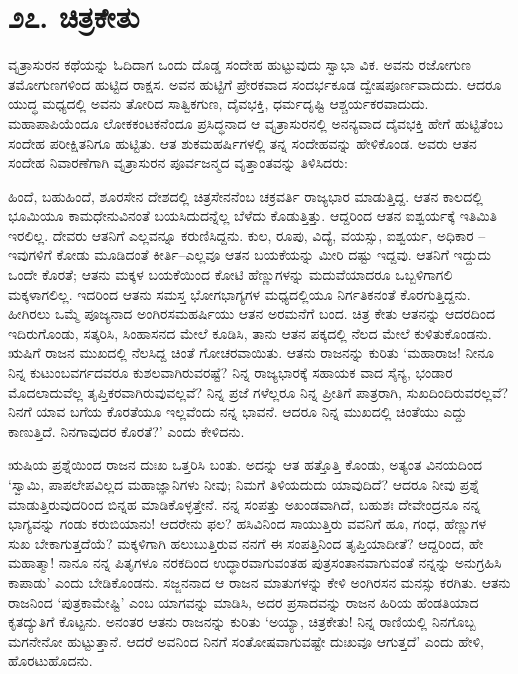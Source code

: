 
\chapter{೨೭. ಚಿತ್ರಕೇತು}

ವೃತ್ರಾಸುರನ ಕಥೆಯನ್ನು ಓದಿದಾಗ ಒಂದು ದೊಡ್ಡ ಸಂದೇಹ ಹುಟ್ಟುವುದು ಸ್ವಾಭಾ ವಿಕ. ಅವನು ರಜೋಗುಣ ತಮೋಗುಣಗಳಿಂದ ಹುಟ್ಟಿದ ರಾಕ್ಷಸ. ಅವನ ಹುಟ್ಟಿಗೆ ಪ್ರೇರಕವಾದ ಸಂದರ್ಭಕೂಡ ದ್ವೇಷಪೂರ್ಣವಾದುದು. ಆದರೂ ಯುದ್ಧ ಮಧ್ಯದಲ್ಲಿ ಅವನು ತೋರಿದ ಸಾತ್ವಿಕಗುಣ, ದೈವಭಕ್ತಿ, ಧರ್ಮದೃಷ್ಟಿ ಆಶ್ಚರ್ಯಕರವಾದುದು. ಮಹಾಪಾಪಿಯೆಂದೂ ಲೋಕಕಂಟಕನೆಂದೂ ಪ್ರಸಿದ್ಧನಾದ ಆ ವೃತ್ರಾಸುರನಲ್ಲಿ ಅನನ್ಯವಾದ ದೈವಭಕ್ತಿ ಹೇಗೆ ಹುಟ್ಟಿತೆಂಬ ಸಂದೇಹ ಪರೀಕ್ಷಿತನಿಗೂ ಹುಟ್ಟಿತು. ಆತ ಶುಕಮಹರ್ಷಿಗಳಲ್ಲಿ ತನ್ನ ಸಂದೇಹವನ್ನು ಹೇಳಿಕೊಂಡ. ಅವರು ಆತನ ಸಂದೇಹ ನಿವಾರಣೆಗಾಗಿ ವೃತ್ರಾಸುರನ ಪೂರ್ವಜನ್ಮದ ವೃತ್ತಾಂತವನ್ನು ತಿಳಿಸಿದರು:

ಹಿಂದೆ, ಬಹುಹಿಂದೆ, ಶೂರಸೇನ ದೇಶದಲ್ಲಿ ಚಿತ್ರಸೇನನೆಂಬ ಚಕ್ರವರ್ತಿ ರಾಜ್ಯಭಾರ ಮಾಡುತ್ತಿದ್ದ. ಆತನ ಕಾಲದಲ್ಲಿ ಭೂಮಿಯೂ ಕಾಮಧೇನುವಿನಂತೆ ಬಯಸಿದುದನ್ನೆಲ್ಲ ಬೆಳೆದು ಕೊಡುತ್ತಿತ್ತು. ಆದ್ದರಿಂದ ಆತನ ಐಶ್ವರ್ಯಕ್ಕೆ ಇತಿಮಿತಿ ಇರಲಿಲ್ಲ. ದೇವರು ಆತನಿಗೆ ಎಲ್ಲವನ್ನೂ ಕರುಣಿಸಿದ್ದನು. ಕುಲ, ರೂಪು, ವಿದ್ಯೆ, ವಯಸ್ಸು, ಐಶ್ವರ್ಯ, ಅಧಿಕಾರ –ಇವುಗಳಿಗೆ ಕೋಡು ಮೂಡಿದಂತೆ ಕೀರ್ತಿ–ಎಲ್ಲವೂ ಆತನ ಬಯಕೆಯನ್ನು ಮೀರಿ ದಷ್ಟು ಇದ್ದವು. ಆತನಿಗೆ ಇದ್ದುದು ಒಂದೇ ಕೊರತೆ; ಆತನು ಮಕ್ಕಳ ಬಯಕೆಯಿಂದ ಕೋಟಿ ಹೆಣ್ಣುಗಳನ್ನು ಮದುವೆಯಾದರೂ ಒಬ್ಬಳಿಗಾಗಲಿ ಮಕ್ಕಳಾಗಲಿಲ್ಲ. ಇದರಿಂದ ಆತನು ಸಮಸ್ತ ಭೋಗಭಾಗ್ಯಗಳ ಮಧ್ಯದಲ್ಲಿಯೂ ನಿರ್ಗತಿಕನಂತೆ ಕೊರಗುತ್ತಿದ್ದನು. ಹೀಗಿರಲು ಒಮ್ಮೆ ಪೂಜ್ಯನಾದ ಅಂಗಿರಸಮಹರ್ಷಿಯು ಆತನ ಅರಮನೆಗೆ ಬಂದ. ಚಿತ್ರ ಕೇತು ಆತನನ್ನು ಆದರದಿಂದ ಇದಿರುಗೊಂಡು, ಸತ್ಕರಿಸಿ, ಸಿಂಹಾಸನದ ಮೇಲೆ ಕೂಡಿಸಿ, ತಾನು ಆತನ ಪಕ್ಕದಲ್ಲಿ ನೆಲದ ಮೇಲೆ ಕುಳಿತುಕೊಂಡನು. ಋಷಿಗೆ ರಾಜನ ಮುಖದಲ್ಲಿ ನೆಲಸಿದ್ದ ಚಿಂತೆ ಗೋಚರವಾಯಿತು. ಆತನು ರಾಜನನ್ನು ಕುರಿತು ‘ಮಹಾರಾಜ! ನೀನೂ ನಿನ್ನ ಕುಟುಂಬವರ್ಗದವರೂ ಕುಶಲವಾಗಿರುವರಷ್ಟೆ? ನಿನ್ನ ರಾಜ್ಯಭಾರಕ್ಕೆ ಸಹಾಯಕ ವಾದ ಸೈನ್ಯ, ಭಂಡಾರ ಮೊದಲಾದುವೆಲ್ಲ ತೃಪ್ತಿಕರವಾಗಿರುವುವಲ್ಲವೆ? ನಿನ್ನ ಪ್ರಜೆ ಗಳೆಲ್ಲರೂ ನಿನ್ನ ಪ್ರೀತಿಗೆ ಪಾತ್ರರಾಗಿ, ಸುಖದಿಂದಿರುವರಲ್ಲವೆ? ನಿನಗೆ ಯಾವ ಬಗೆಯ ಕೊರತೆಯೂ ಇಲ್ಲವೆಂದು ನನ್ನ ಭಾವನೆ. ಆದರೂ ನಿನ್ನ ಮುಖದಲ್ಲಿ ಚಿಂತೆಯು ಎದ್ದು ಕಾಣುತ್ತಿದೆ. ನಿನಗಾವುದರ ಕೊರತೆ?’ ಎಂದು ಕೇಳಿದನು.

ಋಷಿಯ ಪ್ರಶ್ನೆಯಿಂದ ರಾಜನ ದುಃಖ ಒತ್ತರಿಸಿ ಬಂತು. ಅದನ್ನು ಆತ ಹತ್ತೊತ್ತಿ ಕೊಂಡು, ಅತ್ಯಂತ ವಿನಯದಿಂದ ‘ಸ್ವಾಮಿ, ಪಾಪಲೇಪವಿಲ್ಲದ ಮಹಾಜ್ಞಾನಿಗಳು ನೀವು; ನಿಮಗೆ ತಿಳಿಯದುದು ಯಾವುದಿದೆ? ಆದರೂ ನೀವು ಪ್ರಶ್ನೆ ಮಾಡುತ್ತಿರುವುದರಿಂದ ಬಿನ್ನಹ ಮಾಡಿಕೊಳ್ಳತ್ತೇನೆ. ನನ್ನ ಸಂಪತ್ತು ಅಖಂಡವಾಗಿದೆ, ಬಹುಶಃ ದೇವೇಂದ್ರನೂ ನನ್ನ ಭಾಗ್ಯವನ್ನು ಗಂಡು ಕರುಬಿಯಾನು! ಆದರೇನು ಫಲ? ಹಸಿವಿನಿಂದ ಸಾಯುತ್ತಿರು ವವನಿಗೆ ಹೂ, ಗಂಧ, ಹೆಣ್ಣುಗಳ ಸುಖ ಬೇಕಾಗುತ್ತದೆಯೆ? ಮಕ್ಕಳಿಗಾಗಿ ಹಲುಬುತ್ತಿರುವ ನನಗೆ ಈ ಸಂಪತ್ತಿನಿಂದ ತೃಪ್ತಿಯಾದೀತೆ? ಆದ್ದರಿಂದ, ಹೇ ಮಹಾತ್ಮಾ! ನಾನೂ ನನ್ನ ಪಿತೃಗಳೂ ನರಕದಿಂದ ಉದ್ಧಾರವಾಗುವಂತಹ ಪುತ್ರಸಂತಾನವಾಗುವಂತೆ ನನ್ನನ್ನು ಅನುಗ್ರಹಿಸಿ ಕಾಪಾಡು’ ಎಂದು ಬೇಡಿಕೊಂಡನು. ಸಜ್ಜನನಾದ ಆ ರಾಜನ ಮಾತುಗಳನ್ನು ಕೇಳಿ ಅಂಗಿರಸನ ಮನಸ್ಸು ಕರಗಿತು. ಆತನು ರಾಜನಿಂದ ‘ಪುತ್ರಕಾಮೇಷ್ಟಿ’ ಎಂಬ ಯಾಗವನ್ನು ಮಾಡಿಸಿ, ಅದರ ಪ್ರಸಾದವನ್ನು ರಾಜನ ಹಿರಿಯ ಹೆಂಡತಿಯಾದ ಕೃತದ್ಯುತಿಗೆ ಕೊಟ್ಟನು. ಅನಂತರ ಆತನು ರಾಜನನ್ನು ಕುರಿತು ‘ಅಯ್ಯಾ, ಚಿತ್ರಕೇತು! ನಿನ್ನ ರಾಣಿಯಲ್ಲಿ ನಿನಗೊಬ್ಬ ಮಗನೇನೋ ಹುಟ್ಟುತ್ತಾನೆ. ಆದರೆ ಅವನಿಂದ ನಿನಗೆ ಸಂತೋಷವಾಗುವಷ್ಟೇ ದುಃಖವೂ ಆಗುತ್ತದೆ’ ಎಂದು ಹೇಳಿ, ಹೊರಟುಹೊದನು.

